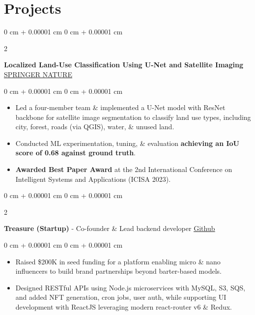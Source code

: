 \documentclass[10pt, a4paper]{article}
\newenvironment{highlights}{
    \begin{itemize}[
        topsep=0 cm,
        parsep=0 cm,
        partopsep=0pt,
        itemsep=0pt,
        leftmargin=0 cm + 10pt
    ]
}{
    \end{itemize}
} %
\newenvironment{onecolentry}{
    \begin{adjustwidth}{
        0 cm + 0.00001 cm
    }{
        0 cm + 0.00001 cm
    }
}{
    \end{adjustwidth}
} %
\newenvironment{twocolentry}[2][]{
    \onecolentry
    \def\secondColumn{#2}
    \setcolumnwidth{\fill, 6.0 cm}
    \begin{paracol}{2}
}{
    \switchcolumn \raggedleft \secondColumn
    \end{paracol}
    \endonecolentry
} %
\begin{document}
    \section{Projects}
        
        \begin{twocolentry}{
            \href{https://doi.org/10.1007/978-981-99-6984-5_15}{\underline{SPRINGER NATURE}}
        }
            \textbf{Localized Land-Use Classification Using U-Net and Satellite Imaging}\end{twocolentry}

        \vspace{0.10 cm}
        \begin{onecolentry}
            \begin{highlights}
                \item Led a four-member team \& implemented a U-Net model with ResNet backbone for satellite image segmentation to classify land use types, including city, forest, roads (via QGIS), water, \& unused land.
                \item Conducted ML experimentation, tuning, \& evaluation \textbf{achieving an IoU score of 0.68 against ground truth}.
                \item \textbf{Awarded Best Paper Award} at the 2nd International Conference on Intelligent Systems and Applications (ICISA 2023).
            \end{highlights}
        \end{onecolentry}


        \vspace{0.10 cm}

        \begin{twocolentry}{
            \href{https://github.com/ammrit2312/treasure-server}{\underline{Github}}
        }
            \textbf{Treasure (Startup)} - Co-founder \& Lead backend developer\end{twocolentry}

        \vspace{0.10 cm}
        \begin{onecolentry}
            \begin{highlights}
                \item Raised \$200K in seed funding for a platform enabling micro \& nano influencers to build brand partnerships beyond barter-based models.
                \item Designed RESTful APIs using Node.js microservices with MySQL, S3, SQS, and added NFT generation, cron jobs, user auth, while supporting UI development with ReactJS leveraging modern react-router v6 \& Redux.
            \end{highlights}
        \end{onecolentry}
\end{document}
